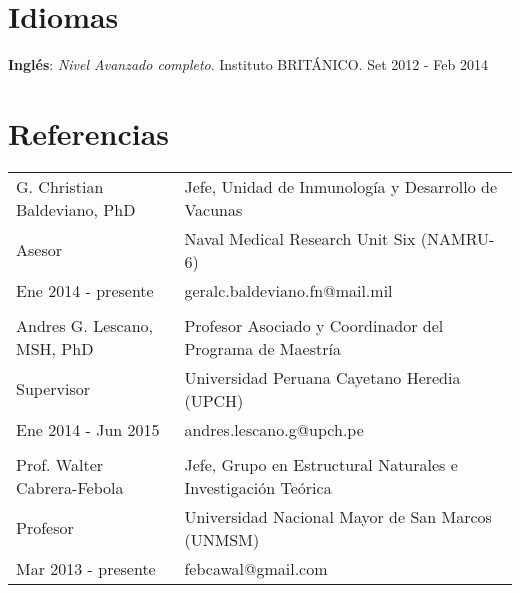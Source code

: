 \documentclass[margin,line]{res}
\begin{document}
\begin{resume}
		
		\section{\sc Idiomas}
		{\bf Inglés}: {\em Nivel Avanzado completo}. Instituto BRITÁNICO. \hfill {Set 2012 - Feb 2014} \\
		
		
		\section{\sc Referencias}
		
		\begin{tabular}{ l l }
			G. Christian Baldeviano, PhD & Jefe, Unidad de Inmunología y Desarrollo de Vacunas\\
			Asesor & Naval Medical Research Unit Six (NAMRU-6)\\
			Ene 2014 - presente & geralc.baldeviano.fn@mail.mil\\
			&\\
			Andres G. Lescano, MSH, PhD & Profesor Asociado y Coordinador del Programa de Maestría\\
			Supervisor & Universidad Peruana Cayetano Heredia (UPCH)\\
			Ene 2014 - Jun 2015 & andres.lescano.g@upch.pe\\
			&\\
			Prof. Walter Cabrera-Febola & Jefe, Grupo en Estructural Naturales e Investigación Teórica\\
			Profesor & Universidad Nacional Mayor de San Marcos (UNMSM)\\
			Mar 2013 - presente & febcawal@gmail.com\\	
		\end{tabular}
		
		
		
		
		
		
		
		

\end{resume}
\end{document}
